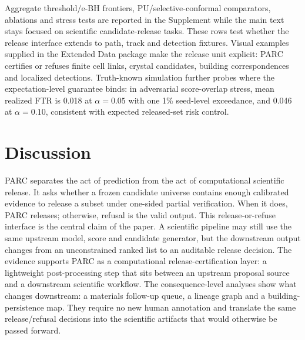 \documentclass[10pt,twocolumn]{article}
\begin{document}
Aggregate threshold/e-BH frontiers, PU/selective-conformal comparators, ablations and stress tests are reported in the Supplement while the main text stays focused on scientific candidate-release tasks.
These rows test whether the release interface extends to path, track and detection fixtures.
Visual examples supplied in the Extended Data package make the release unit explicit: PARC certifies or refuses finite cell links, crystal candidates, building correspondences and localized detections.
Truth-known simulation further probes where the expectation-level guarantee binds: in adversarial score-overlap stress, mean realized FTR is 0.018 at \(\alpha=0.05\) with one 1\% seed-level exceedance, and 0.046 at \(\alpha=0.10\), consistent with expected released-set risk control.


\section{Discussion}

PARC separates the act of prediction from the act of computational scientific release.
It asks whether a frozen candidate universe contains enough calibrated evidence to release a subset under one-sided partial verification.
When it does, PARC releases; otherwise, refusal is the valid output.
This release-or-refuse interface is the central claim of the paper.
A scientific pipeline may still use the same upstream model, score and candidate generator, but the downstream output changes from an unconstrained ranked list to an auditable release decision.
The evidence supports PARC as a computational release-certification layer: a lightweight post-processing step that sits between an upstream proposal source and a downstream scientific workflow.
The consequence-level analyses show what changes downstream: a materials follow-up queue, a lineage graph and a building-persistence map.
They require no new human annotation and translate the same release/refusal decisions into the scientific artifacts that would otherwise be passed forward.
\end{document}
